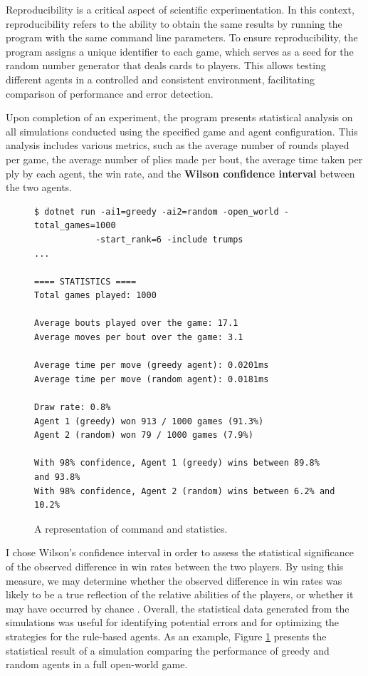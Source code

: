 Reproducibility is a critical aspect of scientific experimentation. In this context, reproducibility refers to the ability to obtain the same results by running the program with the same command line parameters. To ensure reproducibility, the program assigns a unique identifier to each game, which serves as a seed for the random number generator that deals cards to players. This allows testing  different agents in a controlled and consistent environment, facilitating comparison of performance and error detection.

Upon completion of an experiment, the program presents statistical analysis on all simulations conducted using the specified game and agent configuration. This analysis includes various metrics, such as the average number of rounds played per game, the average number of plies made per bout, the average time taken per ply by each agent, the win rate, and the \textbf{Wilson confidence interval} between the two agents.

\begin{figure}[h]
\captionsetup{justification=centering}
\begin{lstlisting}
$ dotnet run -ai1=greedy -ai2=random -open_world -total_games=1000 
			-start_rank=6 -include trumps
...

==== STATISTICS ====
Total games played: 1000

Average bouts played over the game: 17.1
Average moves per bout over the game: 3.1

Average time per move (greedy agent): 0.0201ms
Average time per move (random agent): 0.0181ms

Draw rate: 0.8%
Agent 1 (greedy) won 913 / 1000 games (91.3%)
Agent 2 (random) won 79 / 1000 games (7.9%)

With 98% confidence, Agent 1 (greedy) wins between 89.8% and 93.8% 
With 98% confidence, Agent 2 (random) wins between 6.2% and 10.2% 
\end{lstlisting}
\caption{A representation of command and statistics.}
\label{fig:statistics}
\end{figure}

I chose Wilson's confidence interval in order to assess the statistical significance of the observed difference in win rates between the two players. By using this measure, we may determine whether the observed difference in win rates was likely to be a true reflection of the relative abilities of the players, or whether it may have occurred by chance \citep{moore_mccabe_craig_2017}. Overall, the statistical data generated from the simulations was useful for identifying potential errors and for optimizing the strategies for the rule-based agents. As an example, Figure \ref{fig:statistics}  presents the statistical result of a simulation comparing the performance of greedy and random agents in a full open-world game.

